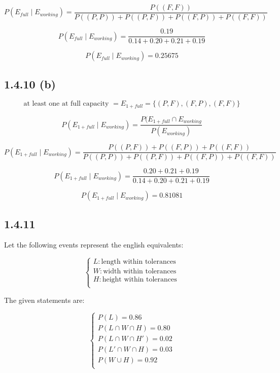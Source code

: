 \documentclass{article}
\begin{document}
\[
P\left(E_{full}\mid E_{working}\right) =
\frac
    {P((F, F))}
    {P((P, P)) + P((P, F)) + P((F, P)) + P((F, F))}
\]

\[
P\left(E_{full}\mid E_{working}\right) =
\frac
    {0.19}
    {0.14 + 0.20 + 0.21 + 0.19}
\]

\[
\boxed{P\left(E_{full}\mid E_{working}\right) = 0.25675}
\]

\subsection*{1.4.10 (b)}

\[
\text{at least one at full capacity } = E_{1+ full} = \{(P, F), (F, P), (F, F)\}
\]

\[
P\left(E_{1+ full}\mid E_{working}\right) =
\frac
    {P(E_{1+ full}\cap E_{working}}
    {P(E_{working})}
\]

\[
P\left(E_{1+ full}\mid E_{working}\right) =
\frac
    {P((P, F)) + P((F, P)) + P((F, F))}
    {P((P, P)) + P((P, F)) + P((F, P)) + P((F, F))}
\]

\[
P\left(E_{1+ full}\mid E_{working}\right) =
\frac
    {0.20 + 0.21 + 0.19}
    {0.14 + 0.20 + 0.21 + 0.19}
\]

\[
\boxed{P\left(E_{1+ full}\mid E_{working}\right) = 0.81081}
\]

\subsection*{1.4.11}

Let the following events represent the english equivalents:

\[
\begin{cases}
L: \text{length within tolerances} \\
W: \text{width within tolerances} \\
H: \text{height within tolerances} \\
\end{cases}
\]

The given statements are:

\[
\begin{cases}
P(L) = 0.86 \\
P(L\cap W\cap H) = 0.80 \\
P(L\cap W\cap H') = 0.02 \\
P(L'\cap W\cap H) = 0.03 \\
P(W\cup H) = 0.92 \\
\end{cases}
\]
\end{document}
